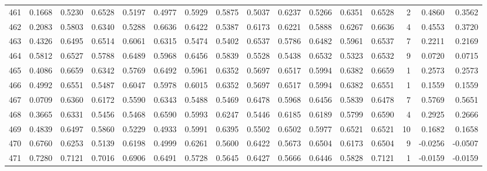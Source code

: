 \begin{tabular}{lrrrrrrrrrrrrrrr}
461 &      0.1668 &  0.5230 &  0.6528 &  0.5197 &  0.4977 &  0.5929 &  0.5875 &  0.5037 &  0.6237 &  0.5266 &   0.6351 &     0.6528 &      2 &                    0.4860 &                     0.3562 \\
462 &      0.2083 &  0.5803 &  0.6340 &  0.5288 &  0.6636 &  0.6422 &  0.5387 &  0.6173 &  0.6221 &  0.5888 &   0.6267 &     0.6636 &      4 &                    0.4553 &                     0.3720 \\
463 &      0.4326 &  0.6495 &  0.6514 &  0.6061 &  0.6315 &  0.5474 &  0.5402 &  0.6537 &  0.5786 &  0.6482 &   0.5961 &     0.6537 &      7 &                    0.2211 &                     0.2169 \\
464 &      0.5812 &  0.6527 &  0.5788 &  0.6489 &  0.5968 &  0.6456 &  0.5839 &  0.5528 &  0.5438 &  0.6532 &   0.5323 &     0.6532 &      9 &                    0.0720 &                     0.0715 \\
465 &      0.4086 &  0.6659 &  0.6342 &  0.5769 &  0.6492 &  0.5961 &  0.6352 &  0.5697 &  0.6517 &  0.5994 &   0.6382 &     0.6659 &      1 &                    0.2573 &                     0.2573 \\
466 &      0.4992 &  0.6551 &  0.5487 &  0.6047 &  0.5978 &  0.6015 &  0.6352 &  0.5697 &  0.6517 &  0.5994 &   0.6382 &     0.6551 &      1 &                    0.1559 &                     0.1559 \\
467 &      0.0709 &  0.6360 &  0.6172 &  0.5590 &  0.6343 &  0.5488 &  0.5469 &  0.6478 &  0.5968 &  0.6456 &   0.5839 &     0.6478 &      7 &                    0.5769 &                     0.5651 \\
468 &      0.3665 &  0.6331 &  0.5456 &  0.5468 &  0.6590 &  0.5993 &  0.6247 &  0.5446 &  0.6185 &  0.6189 &   0.5799 &     0.6590 &      4 &                    0.2925 &                     0.2666 \\
469 &      0.4839 &  0.6497 &  0.5860 &  0.5229 &  0.4933 &  0.5991 &  0.6395 &  0.5502 &  0.6502 &  0.5977 &   0.6521 &     0.6521 &     10 &                    0.1682 &                     0.1658 \\
470 &      0.6760 &  0.6253 &  0.5139 &  0.6198 &  0.4999 &  0.6261 &  0.5600 &  0.6422 &  0.5673 &  0.6504 &   0.6173 &     0.6504 &      9 &                   -0.0256 &                    -0.0507 \\
471 &      0.7280 &  0.7121 &  0.7016 &  0.6906 &  0.6491 &  0.5728 &  0.5645 &  0.6427 &  0.5666 &  0.6446 &   0.5828 &     0.7121 &      1 &                   -0.0159 &                    -0.0159 \\

\end{tabular}
